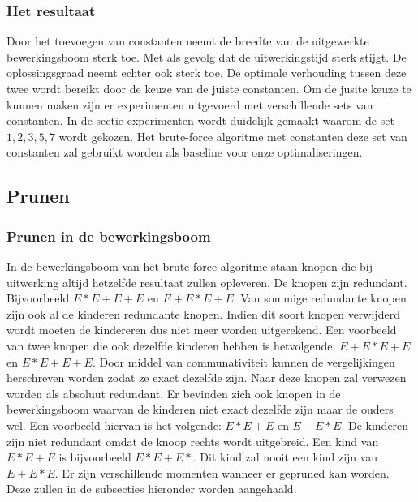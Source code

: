 \documentclass[Main.tex]{subfiles}
\begin{document}
\subsubsection*{Het resultaat}
Door het toevoegen van constanten neemt de breedte van de uitgewerkte bewerkingsboom sterk toe. Met als gevolg dat de uitwerkingstijd sterk stijgt. De oplossingsgraad neemt echter ook sterk toe. De optimale verhouding tussen deze twee wordt bereikt door de keuze van de juiste constanten. Om de jusite keuze te kunnen maken zijn er experimenten uitgevoerd met verschillende sets van constanten. In de sectie experimenten %
wordt duidelijk gemaakt waarom de set ${1, 2, 3, 5, 7}$ wordt gekozen. Het brute-force algoritme met constanten deze set van constanten zal gebruikt worden als baseline voor onze optimaliseringen.

\subsection{Prunen} \label{ssec:Prunen}
\subsubsection*{Prunen in de bewerkingsboom}
In de bewerkingsboom van het brute force algoritme staan knopen die bij uitwerking altijd hetzelfde resultaat zullen opleveren. De knopen zijn redundant. Bijvoorbeeld $E \ast E+E+E$ en $E+E \ast E +E$. Van sommige redundante knopen zijn ook al de kinderen redundante knopen. Indien dit soort knopen verwijderd wordt moeten de kindereren dus niet meer worden uitgerekend. Een voorbeeld van twee knopen die ook dezelfde kinderen hebben is hetvolgende: $E+E \ast E+E$ en $E \ast E+E+E$. Door middel van communativiteit kunnen de vergelijkingen herschreven worden zodat ze exact dezelfde zijn. Naar deze knopen zal verwezen worden als absoluut redundant. Er bevinden zich ook knopen in de bewerkingsboom waarvan de kinderen niet exact dezelfde zijn maar de ouders wel. Een voorbeeld hiervan is het volgende: $E \ast E+E$ en $E+E \ast E$. De kinderen zijn niet redundant omdat de knoop rechts wordt uitgebreid. Een kind van $E \ast E+E$ is bijvoorbeeld $E \ast E+E \ast$. Dit kind zal nooit een kind zijn van $E+E \ast E$. Er zijn verschillende momenten wanneer er gepruned kan worden. Deze zullen in de subsecties hieronder worden aangehaald.
\end{document}
